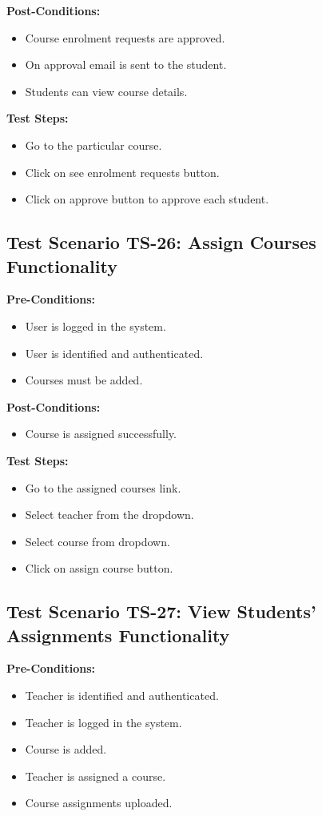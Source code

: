 \textbf{Post-Conditions: }
\begin{itemize}
\item Course enrolment requests are approved.
\item On approval email is sent to the student.
\item Students can view course details.


\end{itemize}
\textbf{Test Steps:}
\begin{itemize}

\item Go to the particular course.
\item Click on see enrolment requests button.
\item Click on approve button to approve each student.

\end{itemize}


\subsection{Test Scenario TS-26: Assign Courses Functionality}
\textbf{Pre-Conditions: }
\begin{itemize}

\item User is logged in the system.
\item User is identified and authenticated.
\item Courses must be added.

\end{itemize}

\textbf{Post-Conditions: }
\begin{itemize}
\item Course is assigned successfully.

\end{itemize}
\textbf{Test Steps:}
\begin{itemize}

\item Go to the assigned courses link.
\item Select teacher from the dropdown.
\item Select course from dropdown.
\item Click on assign course button.

\end{itemize}



\subsection{Test Scenario TS-27: View Students' Assignments Functionality}
\textbf{Pre-Conditions: }
\begin{itemize}

\item Teacher is identified and authenticated.
\item Teacher is logged in the system.
\item Course is added.
\item Teacher is assigned a course.
\item Course assignments uploaded.

\end{itemize}

